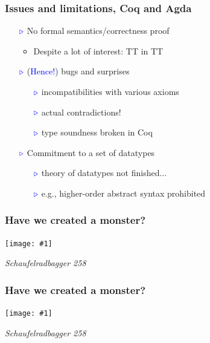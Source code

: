 \documentclass[11pt]{beamer}
\newcommand{\myb}[0]{\ensuremath{\textcolor{blue}{\triangleright}}}
\begin{document}
\begin{frame}
  \frametitle{Issues and limitations, Coq and Agda}

  \begin{itemize}
  \item[$\myb$] No formal semantics/correctness proof
    \begin{itemize}
    \item Despite a lot of interest: TT in TT
      \end{itemize}

\vspace{.1cm}

  \item[$\myb$] (\textcolor{blue}{Hence!}) bugs and surprises
    \begin{itemize}
    \item[$\myb$] incompatibilities with various axioms
    \item[$\myb$] actual contradictions!
    \item[$\myb$] type soundness broken in Coq
    \end{itemize}

\vspace{.1cm}

  \item[$\myb$] Commitment to a set of datatypes
    \begin{itemize}
      \item[$\myb$] theory of datatypes not finished...
      \item[$\myb$] e.g., higher-order abstract syntax prohibited
    \end{itemize}
  \end{itemize}
\end{frame}

\newcommand{\monsterf}[1]{\begin{frame}
  \frametitle{Have we created a monster?}

  \texttt{[image: \#1]}

  {\small \emph{Schaufelradbagger 258}}

\end{frame}
}

\monsterf{bagger258a}
\monsterf{bagger258b}
\end{document}
